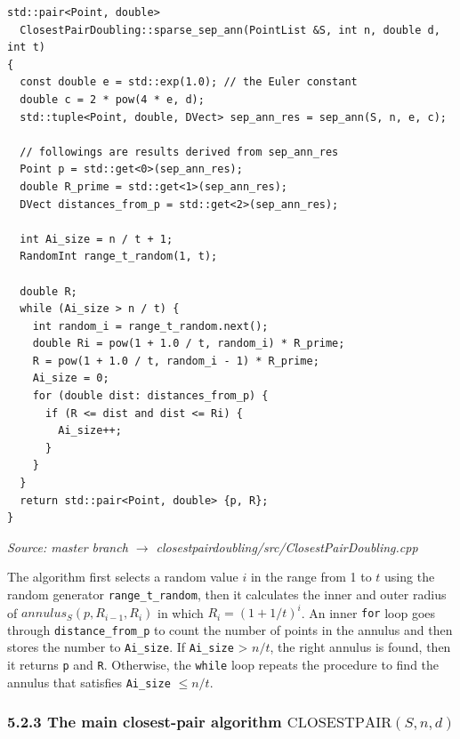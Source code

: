\documentclass[12pt,english,]{article}
\newcommand{\code}[1]{\colorbox{light-gray}{\texttt{#1}}}
\newcommand{\pnt}[1]{{\scriptstyle#1}}
\begin{document}
\begin{lstlisting}
std::pair<Point, double>
  ClosestPairDoubling::sparse_sep_ann(PointList &S, int n, double d, int t)
{
  const double e = std::exp(1.0); // the Euler constant
  double c = 2 * pow(4 * e, d);
  std::tuple<Point, double, DVect> sep_ann_res = sep_ann(S, n, e, c);

  // followings are results derived from sep_ann_res
  Point p = std::get<0>(sep_ann_res);
  double R_prime = std::get<1>(sep_ann_res);
  DVect distances_from_p = std::get<2>(sep_ann_res);

  int Ai_size = n / t + 1;
  RandomInt range_t_random(1, t);

  double R;
  while (Ai_size > n / t) {
    int random_i = range_t_random.next();
    double Ri = pow(1 + 1.0 / t, random_i) * R_prime;
    R = pow(1 + 1.0 / t, random_i - 1) * R_prime;
    Ai_size = 0;
    for (double dist: distances_from_p) {
      if (R <= dist and dist <= Ri) {
        Ai_size++;
      }
    }
  }
  return std::pair<Point, double> {p, R};
}
\end{lstlisting}
\vspace{-9truemm}
\begin{minipage}{1\textwidth}
  \begin{flushright}
  {\footnotesize \emph{Source: master branch $\rightarrow$ closestpairdoubling/src/ClosestPairDoubling.cpp}\par}
  \end{flushright}
\end{minipage}
\vspace{0.5truemm}

The algorithm first selects a random value \(i\) in the range from 1 to
\(t\) using the random generator \code{range\_t\_random}, then it
calculates the inner and outer radius of \(annulus_S(p, R_{i-1}, R_i)\)
in which \(R_i = (1+1/t)^i\). An inner \code{for} loop goes through
\code{distance\_from\_p} to count the number of points in the annulus
and then stores the number to \code{Ai\_size}. If \code{Ai\_size}
\textgreater{} \(n/t\), the right annulus is found, then it returns
\code{p} and \code{R}. Otherwise, the \code{while} loop repeats the
procedure to find the annulus that satisfies \code{Ai\_size}
\(\leq n/t\).

\hypertarget{section5.2.3}{%
\subsubsection{\texorpdfstring{5.2.3 The main closest-pair algorithm
\(\mathrm{C\pnt{LOSEST}P\pnt{AIR}}(S,n,d)\)}{5.2.3 The main closest-pair algorithm \textbackslash{}mathrm\{C\textbackslash{}pnt\{LOSEST\}P\textbackslash{}pnt\{AIR\}\}(S,n,d)}}\label{section5.2.3}}
\end{document}
